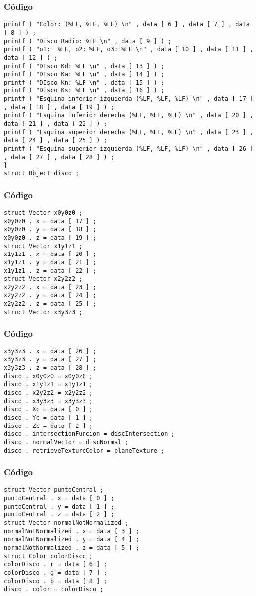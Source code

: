 \documentclass{beamer}
\begin{document}
\begin{frame}[fragile]
\frametitle{C\'odigo}
\begin{verbatim}
printf ( "Color: (%LF, %LF, %LF) \n" , data [ 6 ] , data [ 7 ] , data [ 8 ] ) ; 
printf ( "Disco Radio: %LF \n" , data [ 9 ] ) ; 
printf ( "o1:  %LF, o2: %LF, o3: %LF \n" , data [ 10 ] , data [ 11 ] , data [ 12 ] ) ; 
printf ( "DIsco Kd: %LF \n" , data [ 13 ] ) ; 
printf ( "DIsco Ka: %LF \n" , data [ 14 ] ) ; 
printf ( "DIsco Kn: %LF \n" , data [ 15 ] ) ; 
printf ( "Disco Ks: %LF \n" , data [ 16 ] ) ; 
printf ( "Esquina inferior izquierda (%LF, %LF, %LF) \n" , data [ 17 ] , data [ 18 ] , data [ 19 ] ) ; 
printf ( "Esquina inferior derecha (%LF, %LF, %LF) \n" , data [ 20 ] , data [ 21 ] , data [ 22 ] ) ; 
printf ( "Esquina superior derecha (%LF, %LF, %LF) \n" , data [ 23 ] , data [ 24 ] , data [ 25 ] ) ; 
printf ( "Esquina superior izquierda (%LF, %LF, %LF) \n" , data [ 26 ] , data [ 27 ] , data [ 28 ] ) ; 
} 
struct Object disco ; 
\end{verbatim}
\end{frame}
\begin{frame}[fragile]
\frametitle{C\'odigo}
\begin{verbatim}
struct Vector x0y0z0 ; 
x0y0z0 . x = data [ 17 ] ; 
x0y0z0 . y = data [ 18 ] ; 
x0y0z0 . z = data [ 19 ] ; 
struct Vector x1y1z1 ; 
x1y1z1 . x = data [ 20 ] ; 
x1y1z1 . y = data [ 21 ] ; 
x1y1z1 . z = data [ 22 ] ; 
struct Vector x2y2z2 ; 
x2y2z2 . x = data [ 23 ] ; 
x2y2z2 . y = data [ 24 ] ; 
x2y2z2 . z = data [ 25 ] ; 
struct Vector x3y3z3 ; 
\end{verbatim}
\end{frame}
\begin{frame}[fragile]
\frametitle{C\'odigo}
\begin{verbatim}
x3y3z3 . x = data [ 26 ] ; 
x3y3z3 . y = data [ 27 ] ; 
x3y3z3 . z = data [ 28 ] ; 
disco . x0y0z0 = x0y0z0 ; 
disco . x1y1z1 = x1y1z1 ; 
disco . x2y2z2 = x2y2z2 ; 
disco . x3y3z3 = x3y3z3 ; 
disco . Xc = data [ 0 ] ; 
disco . Yc = data [ 1 ] ; 
disco . Zc = data [ 2 ] ; 
disco . intersectionFuncion = discIntersection ; 
disco . normalVector = discNormal ; 
disco . retrieveTextureColor = planeTexture ; 
\end{verbatim}
\end{frame}
\begin{frame}[fragile]
\frametitle{C\'odigo}
\begin{verbatim}
struct Vector puntoCentral ; 
puntoCentral . x = data [ 0 ] ; 
puntoCentral . y = data [ 1 ] ; 
puntoCentral . z = data [ 2 ] ; 
struct Vector normalNotNormalized ; 
normalNotNormalized . x = data [ 3 ] ; 
normalNotNormalized . y = data [ 4 ] ; 
normalNotNormalized . z = data [ 5 ] ; 
struct Color colorDisco ; 
colorDisco . r = data [ 6 ] ; 
colorDisco . g = data [ 7 ] ; 
colorDisco . b = data [ 8 ] ; 
disco . color = colorDisco ; 
\end{verbatim}
\end{frame}
\end{document}
